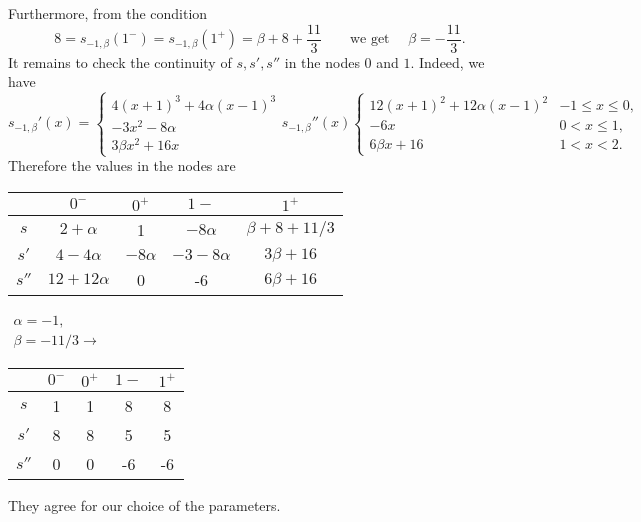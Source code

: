\begin{problem}
\begin{subproblem}[2]
\begin{solution}
Furthermore, from the condition
$$8=s_{-1,\beta}(1^-)=s_{-1,\beta}(1^+)=\beta+8+\frac{11}{3}\qquad
\text{we get }\quad\beta=-\frac{11}{3}.$$
It remains to check the continuity of $s,s',s''$ in the nodes $0$ and $1$. Indeed, we have
$$s_{-1,\beta}'(x)=
\begin{cases}
4(x+1)^3+4\alpha(x-1)^3   \\
-3x^2-8\alpha             \\
3\beta x^2+16x
\end{cases}
s_{-1,\beta}''(x)
\begin{cases}
 12(x+1)^2+12\alpha(x-1)^2  &-1\le x\le0,\\
 -6x  & 0<x\le 1,\\
6\beta x+16 & 1<x<2.
\end{cases}$$
Therefore the values in the nodes are

\begin{tabular}{  c | c c | c c | }%
 & $0^-$ & $0^+$ & $1-$ & $1^+$\\ \hline
$s$ & $2+\alpha$ & 1 & $-8\alpha$ & $\beta+8+11/3$\\
$s'$ & $4-4\alpha$ & $-8\alpha$ & $-3-8\alpha$ & $3\beta+16$\\
$s''$ & $12+12\alpha$ & 0 & -6 & $6\beta+16$%
\end{tabular}
$\begin{matrix}
\alpha=-1, \\ \beta=-11/3\rightarrow
\end{matrix}$
\begin{tabular}{  c | c c | c c | }%
 & $0^-$ & $0^+$ & $1-$ & $1^+$\\ \hline
$s$ & 1 & 1 & 8 & 8\\
$s'$ & 8 & 8 & 5 & 5\\
$s''$ & 0 & 0 & -6 & -6%
\end{tabular}

They agree for our choice of the parameters.
\end{solution}
\end{subproblem}



\end{problem}
